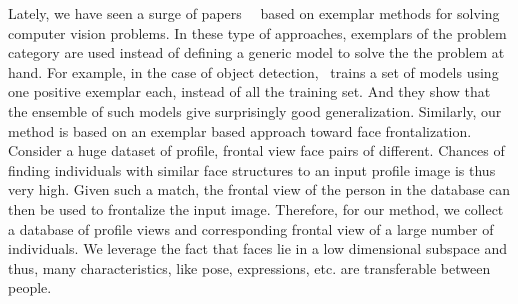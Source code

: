 Lately, we have seen a surge of papers~\cite{malisiewicz-iccv11}~\cite{B-WeiBoy08} based on exemplar methods for solving computer vision problems. 
In these type of approaches, exemplars of the problem category are used instead of defining a
generic model to solve the 
the problem at hand. For example, in the case of object detection,~\cite{malisiewicz-iccv11} trains a set of models 
using one positive exemplar each, instead of all the training set. And they show that the ensemble of such 
models give surprisingly good generalization. Similarly, our method is based on an exemplar based approach 
toward face frontalization. Consider a huge dataset of profile, frontal view face pairs of different. Chances of finding 
individuals with similar face structures to an input profile image is thus very high. Given such a
match, the frontal view of the person in the database can then be used to frontalize the input
image.  Therefore, for our method, we collect a database 
of profile views and corresponding frontal view of a large number of individuals. We leverage the fact that 
faces lie in a low dimensional subspace and thus, many characteristics, like pose, expressions, etc.
are transferable between people.
